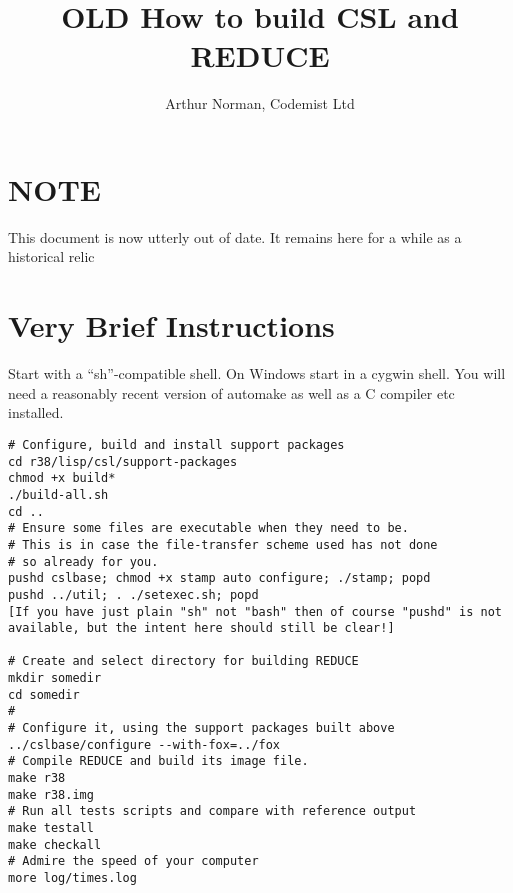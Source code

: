 \documentclass[11pt]{article}
\begin{document}
\title{{\bf OLD} How to build CSL and REDUCE}
\author{Arthur Norman, Codemist Ltd}
\maketitle
\section{NOTE}
{\HUGE This document is now utterly out of date. It remains here for
a while as a historical relic}

\section{Very Brief Instructions}
Start with a ``sh''-compatible shell. On Windows start in a
cygwin shell. You will need a reasonably recent version of
automake as well as a C compiler etc installed.
\begin{verbatim}
# Configure, build and install support packages
cd r38/lisp/csl/support-packages
chmod +x build*
./build-all.sh
cd ..
# Ensure some files are executable when they need to be.
# This is in case the file-transfer scheme used has not done
# so already for you.
pushd cslbase; chmod +x stamp auto configure; ./stamp; popd
pushd ../util; . ./setexec.sh; popd
[If you have just plain "sh" not "bash" then of course "pushd" is not
available, but the intent here should still be clear!]

# Create and select directory for building REDUCE
mkdir somedir
cd somedir
#
# Configure it, using the support packages built above
../cslbase/configure --with-fox=../fox
# Compile REDUCE and build its image file.
make r38
make r38.img
# Run all tests scripts and compare with reference output
make testall
make checkall
# Admire the speed of your computer
more log/times.log
\end{verbatim}
\end{document}
